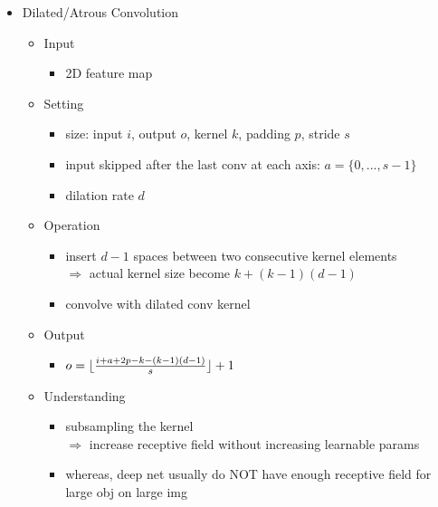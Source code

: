 \begin{itemize}
\item Dilated/Atrous Convolution
	\begin{itemize}
	\item Input
		\begin{itemize}
		\item 2D feature map
		\end{itemize}
	\item Setting
		\begin{itemize}
		\item size: input $i$, output $o$, kernel $k$, padding $p$, stride $s$
		\item input skipped after the last conv at each axis: $a=\{0,...,s-1\}$
		\item dilation rate $d$
		\end{itemize}
	\item Operation
		\begin{itemize}
		\item insert $d-1$ spaces between two consecutive kernel elements \\
		$\Rightarrow$ actual kernel size become $k+(k-1)(d-1)$
		\item convolve with dilated conv kernel
		\end{itemize}
	\item Output
		\begin{itemize}
		\item $o=\lfloor\frac{i+a+2p-k-(k-1)(d-1)}{s}\rfloor+1$
		\end{itemize}
	\item Understanding
		\begin{itemize}
		\item subsampling the kernel \\
		$\Rightarrow$ increase receptive field without increasing learnable params
		\item whereas, deep net usually do NOT have enough receptive field for large obj on large img
		\end{itemize}
	\end{itemize}


\end{itemize}
